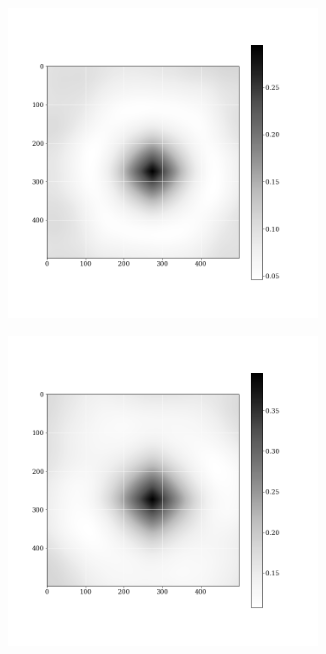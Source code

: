 \documentclass[12pt, a4paper]{report}
\begin{document}
\begin{figure}[H]
\begin{subfigure}{.32\textwidth}
  \centering
  \includegraphics[width=0.9\textwidth]{Pictures/images9/cub_image_03_560.png}
  \label{img:microstrImg}
\end{subfigure}
\begin{subfigure}{.32\textwidth}
  \centering
  \includegraphics[width=0.9\textwidth]{Pictures/images9/cub_image_04_560.png}

\end{subfigure}
\end{figure}
\end{document}
